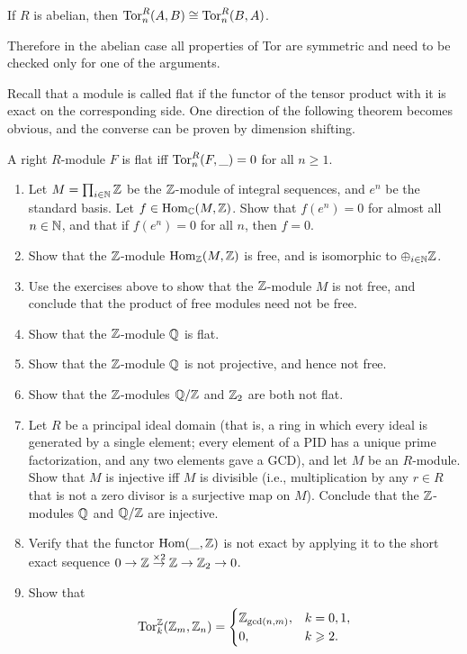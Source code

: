 \begin{cor}
    If $R$ is abelian, then $\operatorname{Tor}_n^R(A,B)\cong \operatorname{Tor}_n^R(B,A)$.
\end{cor}

Therefore in the abelian case all properties of Tor are symmetric and need to be checked only for one of the arguments.

Recall that a module is called flat if the functor of the tensor product with it is exact on the corresponding side.  One direction of the following theorem becomes obvious, and the converse can be proven by dimension shifting.

\begin{thm}
    A right $R$-module $F$ is flat iff $\operatorname{Tor}_n^R(F,\_)=0$ for all $n\geq 1$.
\end{thm}

\begin{xca}
    \begin{enumerate}
        \item Let $M=\prod_{i\in\mathbb{N}}\mathbb{Z}$ be the $\mathbb{Z}$-module of integral sequences, and $e^n$ be the standard basis. Let $f\in \operatorname{Hom}_{\mathbb{C}}(M,\mathbb{Z})$. Show that $f(e^n)=0$ for almost all $n\in \mathbb{N}$, and that if $f(e^n)=0$ for all $n$, then $f=0$.
        \item Show that the $\mathbb{Z}$-module $\operatorname{Hom}_{\mathbb{Z}}(M,\mathbb{Z})$ is free, and is isomorphic to $\oplus_{i\in \mathbb{N}}\mathbb{Z}$.
        \item Use the exercises above to show that the $\mathbb{Z}$-module $M$ is not free, and conclude that the product of free modules need not be free.
        \item Show that the $\mathbb{Z}$-module $\mathbb{Q}$ is flat.
        \item Show that the $\mathbb{Z}$-module $\mathbb{Q}$ is not projective, and hence not free.
        \item Show that the $\mathbb{Z}$-modules $\mathbb{Q}\slash\mathbb{Z}$ and $\mathbb{Z}_2$ are both not flat.
        \item Let $R$ be a principal ideal domain (that is, a ring in which every ideal is generated by a single element; every element of a PID has a unique prime factorization, and any two elements gave a GCD), and let $M$ be an $R$-module. Show that $M$ is injective iff $M$ is divisible (i.e., multiplication by any $r\in R$ that is not a zero divisor is a surjective map on $M$). Conclude that the $\mathbb{Z}$-modules $\mathbb{Q}$ and $\mathbb{Q}\slash\mathbb{Z}$ are injective.
        \item Verify that the functor $\operatorname{Hom}(\_,\mathbb{Z})$ is not exact by applying it to the short exact sequence $0\to \mathbb{Z}\overset{\times 2}{\to}\mathbb{Z}\to \mathbb{Z}_2\to 0$.
        \item Show that 
            \[\operatorname{Tor}_k^{\mathbb{Z}}(\mathbb{Z}_m,\mathbb{Z}_n)=
                \begin{cases}
                \mathbb{Z}_{\gcd(n,m)},&k=0,1,\\
                0,& k\geqslant 2.
                \end{cases}
            \]
    \end{enumerate}
\end{xca}


